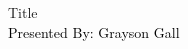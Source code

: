 \documentclass[aspectratio=169, 16pt]{beamer}
\begin{document}
%
%
{
\begin{frame}
  \centering
  \vspace*{1.5cm}
	{\huge Title}\\
   \vbox{
    \vspace*{1.5cm}
    \textcolor{black}{\Large Presented By: Grayson Gall}
  }
\end{frame}
}
\end{document}
